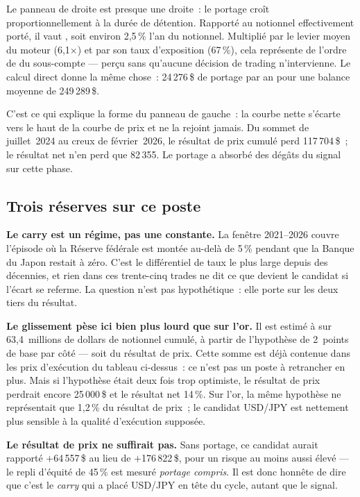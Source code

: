 Le panneau de droite est presque une droite~: le portage croît proportionnellement
à la durée de détention. Rapporté au notionnel effectivement porté, il vaut
, soit environ 2,5\,\% l'an du notionnel.
Multiplié par le levier moyen du moteur (6,1$\times$) et par son taux
d'exposition (67\,\%), cela représente de l'ordre de  du
sous-compte --- perçu sans qu'aucune décision de trading n'intervienne. Le
calcul direct donne la même chose~: 24\,276\,\$ de portage par an pour une
balance moyenne de 249\,289\,\$.

C'est ce qui explique la forme du panneau de gauche~: la courbe nette s'écarte
vers le haut de la courbe de prix et ne la rejoint jamais. Du sommet de
juillet~2024 au creux de février~2026, le résultat de prix cumulé perd
117\,704\,\$~; le résultat net n'en perd que 82\,355. Le portage a absorbé
 des dégâts du signal sur cette phase.

\subsection{Trois réserves sur ce poste}

\textbf{Le carry est un régime, pas une constante.} La fenêtre 2021--2026
couvre l'épisode où la Réserve fédérale est montée au-delà de 5\,\% pendant que
la Banque du Japon restait à zéro. C'est le différentiel de taux le plus large
depuis des décennies, et rien dans ces trente-cinq trades ne dit ce que devient
le candidat si l'écart se referme. La question n'est pas hypothétique~: elle
porte sur les deux tiers du résultat.

\textbf{Le glissement pèse ici bien plus lourd que sur l'or.} Il est estimé à
 sur 63,4~millions de dollars de notionnel cumulé, à partir
de l'hypothèse de 2~points de base par côté --- soit  du
résultat de prix. Cette somme est déjà contenue dans les prix d'exécution du
tableau ci-dessus~: ce n'est pas un poste à retrancher en plus. Mais si
l'hypothèse était deux fois trop optimiste, le résultat de prix perdrait encore
25\,000\,\$ et le résultat net 14\,\%. Sur l'or, la même hypothèse ne
représentait que 1,2\,\% du résultat de prix~; le candidat USD/JPY est
nettement plus sensible à la qualité d'exécution supposée.

\textbf{Le résultat de prix ne suffirait pas.} Sans portage, ce candidat aurait
rapporté $+$64\,557\,\$ au lieu de $+$176\,822\,\$, pour un risque au moins
aussi élevé --- le repli d'équité de 45\,\% est mesuré \emph{portage compris}.
Il est donc honnête de dire que c'est le \emph{carry} qui a placé USD/JPY en
tête du cycle, autant que le signal.
